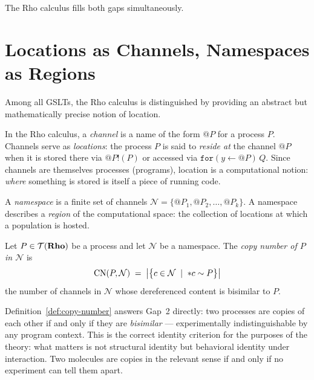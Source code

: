 The Rho calculus fills both gaps simultaneously.

\section{Locations as Channels, Namespaces as Regions}

Among all GSLTs, the Rho calculus is distinguished by providing
an abstract but mathematically precise notion of location.

\begin{definition}
In the Rho calculus, a \emph{channel} is a name of the form
$@P$ for a process $P$.
Channels serve as \emph{locations}: the process $P$ is said to
\emph{reside at} the channel $@P$ when it is stored there via
$@P!(P)$ or accessed via $\mathtt{for}(y \leftarrow @P)\,Q$.
Since channels are themselves processes (programs), location is
a computational notion: \emph{where} something is stored is itself
a piece of running code.
\end{definition}

\begin{definition}[Namespace]
A \emph{namespace} is a finite set of channels
$\mathcal{N} = \{@P_1, @P_2, \ldots, @P_k\}$.
A namespace describes a \emph{region} of the computational space:
the collection of locations at which a population is hosted.
\end{definition}

\begin{definition}
\label{def:copy-number}
Let $P \in \mathcal{T}(\mathbf{Rho})$ be a process and let $\mathcal{N}$ be a
namespace.
The \emph{copy number of $P$ in $\mathcal{N}$} is
\[
  \mathrm{CN}(P, \mathcal{N}) \;=\;
  \bigl|\bigl\{ c \in \mathcal{N} \;\mid\; {*}c \sim P \bigr\}\bigr|
\]
the number of channels in $\mathcal{N}$ whose dereferenced content
is bisimilar to $P$.
\end{definition}

\begin{remark}
Definition~\ref{def:copy-number} answers Gap~2 directly: two
processes are copies of each other if and only if they are
\emph{bisimilar} --- experimentally indistinguishable by any
program context.
This is the correct identity criterion for the purposes of the
theory: what matters is not structural identity but behavioral
identity under interaction.
Two molecules are copies in the relevant sense if and only if no
experiment can tell them apart.
\end{remark}

